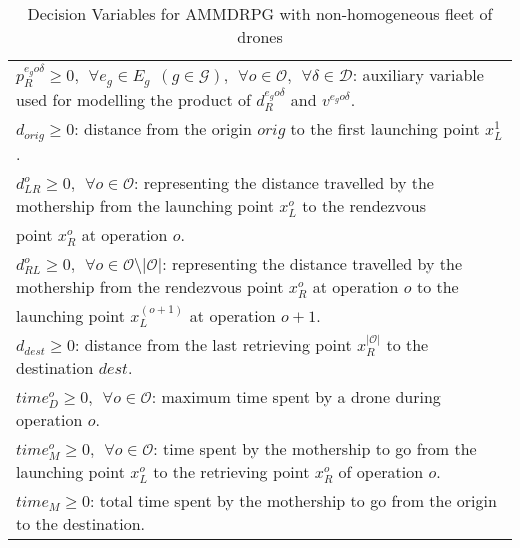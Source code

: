 \begin{table}[h!]
\begin{tabular}{|l|}
$p_R^{e_go\delta} \geq 0, \:\: \forall e_g \in E_g\:\: (g \in \mathcal{G}), \:\:\forall o \in \mathcal O, \:\:\forall \delta\in\mathcal D$: auxiliary variable used for modelling the product of $d_R^{e_go\delta}$ and $v^{e_go\delta}$.\\
$d_{orig}\geq 0$: distance from the origin $orig$ to the first launching point $x_L^1$.\\
$d_{LR}^o \geq 0, \:\: \forall o \in \mathcal O$: representing the distance travelled by the mothership from the launching point $x_L^o$ to the rendezvous\\
\hspace*{1cm}   point $x_R^o$ at operation $o$.\\
$d_{RL}^o \geq 0, \:\: \forall o \in \mathcal O\setminus|\mathcal O|$: representing the distance travelled by the mothership from the rendezvous point $x_R^o$ at operation $o$ to the \\ 
\hspace*{1cm}  launching point $x_L^{(o+1)}$ at operation $o+1$.\\
$d_{dest}\geq 0$: distance from the last retrieving point $x_R^{|\mathcal O|}$ to the destination $dest$.\\
$time_D^o \geq 0, \:\: \forall o \in \mathcal O$: maximum time spent by a drone during operation $o$.\\
$time_M^o \geq 0, \:\: \forall o \in \mathcal O$: time spent by the mothership to go from the launching point $x_L^o$ to the retrieving point $x_R^o$ of operation $o$.\\
$time_M \geq 0$: total time spent by the mothership to go from the origin to the destination.\\
\hline
\end{tabular}
\caption{Decision Variables for AMMDRPG with non-homogeneous fleet of drones}
\label{table:At2}
\end{table}

